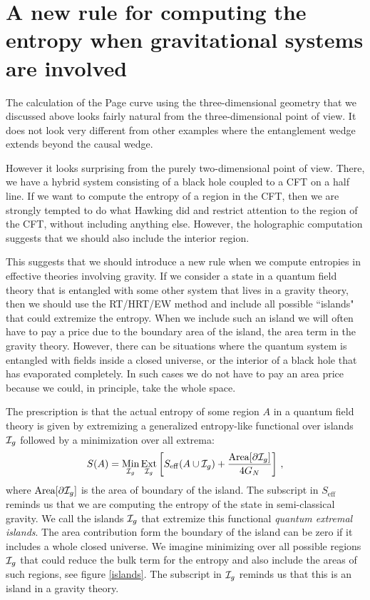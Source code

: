 \documentclass[12pt]{article}
\newcommand{\be}{\begin{equation}}
\newcommand{\ee}{\end{equation}}
\def\la{\label}
\begin{document}
\section{A new rule for computing the entropy when gravitational systems are involved} 
\label{sec:newrule}
 
The calculation of the Page curve using the three-dimensional geometry that we discussed above looks fairly natural from the three-dimensional point of view. 
It does not look very different from other examples where the entanglement wedge extends beyond the causal wedge. 

However it looks surprising from the purely two-dimensional point of view.
There, we have a hybrid system consisting of a black hole coupled to a CFT on a half line.
If we want to compute the entropy of a region in the CFT, then we are strongly tempted to do what Hawking did \cite{Hawking:1976ra}
and restrict attention to the region of the CFT, without including anything else.
However, the holographic computation suggests that we should also include the interior region. 

This suggests that we should introduce a new rule when we compute entropies in effective theories involving gravity. 
If we consider a state in a quantum field theory that is entangled with some other system that lives in a gravity theory, then we should use the RT/HRT/EW method and  include all possible ``islands" that could extremize the entropy.
When we include such an island we will often have to pay a price due to the boundary area of the island, the area term in the gravity theory.
However, there can be situations where the quantum system is entangled with fields inside a closed universe, or the interior of a black hole that has evaporated completely.
In such cases we do not have to pay an area price because we could, in principle, take the whole space. 

The prescription is that the actual entropy of some region $A$ in a quantum field theory is given by extremizing a generalized entropy-like functional over islands ${\cal I}_g$ followed by a minimization over all extrema:
\be 
    \la{NewRule}
    S(A) = \underset{{\cal I}_g}{\rm Min}  \, \underset{{\cal I}_g}{\rm Ext}  \left[ S_{\rm eff}(A \cup {{\cal I}_g}) + { \text{Area}[{\partial {\cal I}_g}] \over 4 G_N} \right] \, ,
\ee
where $\text{Area}[{\partial {\cal I}_g}]$ is the area of boundary of the island. The subscript in $S_\text{eff}$ reminds us that we are computing the entropy of the state in semi-classical gravity.
We call the islands ${\cal I}_g$ that extremize this functional \emph{quantum extremal islands}. 
The area contribution form the boundary of the island can be zero if it includes a whole closed universe. 
We imagine minimizing over all possible regions ${{\cal I}_g}$ that could reduce the bulk term for the entropy and also include the areas of such regions, see figure \ref{islands}. 
The subscript in ${{\cal I}_g}$ reminds us that this is an island in a gravity theory. 
\end{document}
